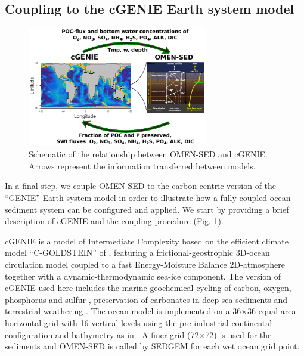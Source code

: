 \documentclass[gmd, manuscript]{copernicus}
\begin{document}
\subsection{Coupling to the cGENIE Earth system model}\label{subsubsec:Methods_ESM_coupling}
\begin{figure}[tbp]
\begin{center}
	\includegraphics[width=0.7\textwidth]{figures/OMEN-GENIE-coupling_GRID.pdf}
	\caption{Schematic of the relationship between OMEN-SED and cGENIE. Arrows represent the information transferred between models. }
	\label{fig:OMEN-GENIE-coupling}
	\end{center}
\end{figure}
In a final step, we couple OMEN-SED to the carbon-centric version of the ``GENIE'' Earth system model \citep[cGENIE,][]{ridgwell_marine_2007} in order to illustrate how a fully coupled ocean-sediment system can be 
configured and applied. We start by providing a brief description of cGENIE and the coupling procedure (Fig. \ref{fig:OMEN-GENIE-coupling}). 

cGENIE is a model of Intermediate Complexity based on the efficient climate model ``C-GOLDSTEIN''  of \citet{edwards_uncertainties_2005}, featuring a frictional-geostrophic 3D-ocean circulation model coupled to a fast 
Energy-Moisture Balance 2D-atmosphere together with a dynamic-thermodynamic sea-ice component. 
The version of cGENIE used here includes the marine geochemical cycling of carbon, oxygen, phosphorus and sulfur \citep{ridgwell_marine_2007}, 
preservation of carbonates in deep-sea sediments \citep[SEDGEM,][]{ridgwell_regulation_2007} and terrestrial weathering \citep{colbourn_rock_2013}. 
The ocean model is implemented on a 36$\times$36 equal-area horizontal grid with 16 vertical levels using the pre-industrial continental configuration and bathymetry as in \citet{archer_atmospheric_2009}. 
A finer grid (72$\times$72) is used for the sediments \citep[see Fig. \ref{fig:TOC_Obs_regridded}C and ][]{ridgwell_regulation_2007} and OMEN-SED is called by SEDGEM for each wet ocean grid point. 
\end{document}
